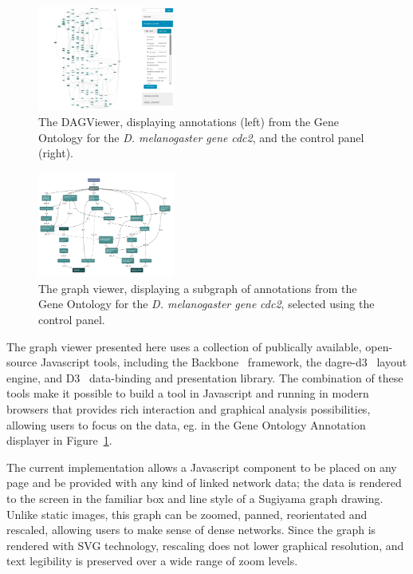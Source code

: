 \documentclass[10pt,a4paper,twocolumn]{article}
\begin{document}
\begin{figure}[htb]
\centering
\includegraphics[width=0.4\textwidth]{dagify.png}
\caption{
    \label{fig:1}
    The DAGViewer, displaying annotations (left) from the Gene Ontology for
    the \textit{D. melanogaster gene} \emph{cdc2}, and the control panel (right).
}
\end{figure}

\begin{figure}[htb]
\centering
\includegraphics[width=0.4\textwidth]{dagify-subgraph.png}
\caption{
  \label{fig:2}
  The graph viewer, displaying a subgraph of annotations from the Gene Ontology
  for the \textit{D. melanogaster gene} \emph{cdc2}, selected using the control panel.
}
\end{figure}

The graph viewer presented here uses a collection of publically available,
open-source Javascript tools, including the Backbone~\cite{backbone} framework,
the dagre-d3~\cite{dagre-d3} layout engine, and D3~\cite{d3} data-binding and
presentation library. The combination of these tools make it possible to build a
tool in Javascript and running in modern browsers that provides rich interaction
and graphical analysis possibilities, allowing users to focus on the data, eg.
in the Gene Ontology Annotation displayer in Figure~\ref{fig:1}.

The current implementation allows a Javascript component to be placed on any
page and be provided with any kind of linked network data; the data is rendered
to the screen in the familiar box and line style of a Sugiyama graph drawing.
Unlike static images, this graph can be zoomed, panned, reorientated and
rescaled, allowing users to make sense of dense networks. Since the graph is
rendered with SVG technology, rescaling does not lower graphical resolution, and
text legibility is preserved over a wide range of zoom levels.
\end{document}
